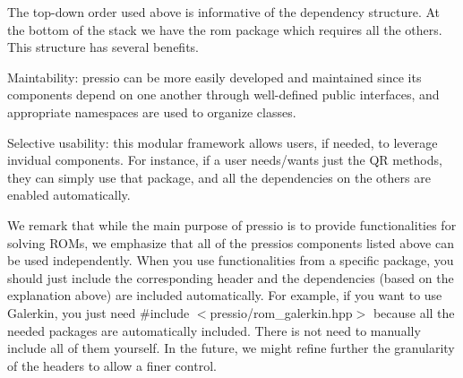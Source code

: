 The top-\/down order used above is informative of the dependency structure. At the bottom of the stack we have the {\ttfamily rom} package which requires all the others. This structure has several benefits.
\begin{DoxyItemize}
\item Maintability\+: {\ttfamily pressio} can be more easily developed and maintained since its components depend on one another through well-\/defined public interfaces, and appropriate namespaces are used to organize classes.
\item Selective usability\+: this modular framework allows users, if needed, to leverage invidual components. For instance, if a user needs/wants just the QR methods, they can simply use that package, and all the dependencies on the others are enabled automatically.
\end{DoxyItemize}



\begin{DoxyParagraph}{}
We remark that while the main purpose of pressio is to provide functionalities for solving ROMs, we emphasize that all of the pressio\textquotesingle{}s components listed above can be used independently. When you use functionalities from a specific package, you should just include the corresponding header and the dependencies (based on the explanation above) are included automatically. For example, if you want to use Galerkin, you just need {\ttfamily \#include $<$pressio/rom\+\_\+galerkin.\+hpp$>$} because all the needed packages are automatically included. There is not need to manually include all of them yourself. In the future, we might refine further the granularity of the headers to allow a finer control. 
\end{DoxyParagraph}
